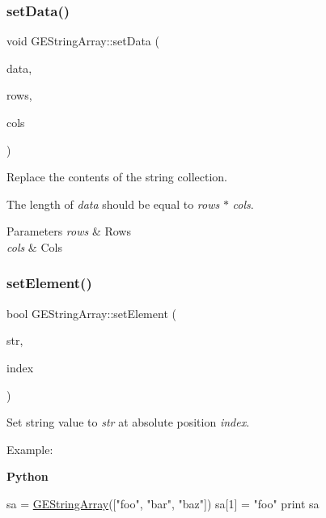 \subsubsection{\texorpdfstring{set\+Data()}{setData()}}
{\footnotesize\ttfamily void G\+E\+String\+Array\+::set\+Data (\begin{DoxyParamCaption}\item[{V\+E\+C\+T\+O\+R\+\_\+\+D\+A\+TA(string)}]{data,  }\item[{int}]{rows,  }\item[{int}]{cols }\end{DoxyParamCaption})}



Replace the contents of the string collection. 

The length of {\itshape data} should be equal to {\itshape rows} $\ast$ {\itshape cols}.


\begin{DoxyParams}{Parameters}
{\em rows} & Rows \\
\hline
{\em cols} & Cols \\
\hline
\end{DoxyParams}
\mbox{\label{class_g_e_string_array_ac8731099a1d1a09a6a3fce0bc9495dfb}} 
\subsubsection{\texorpdfstring{set\+Element()}{setElement()}\hspace{0.1cm}{\footnotesize\ttfamily [1/2]}}
{\footnotesize\ttfamily bool G\+E\+String\+Array\+::set\+Element (\begin{DoxyParamCaption}\item[{const string \&}]{str,  }\item[{int}]{index }\end{DoxyParamCaption})}



Set string value to {\itshape str} at absolute position {\itshape index}. 

Example\+:

{\bfseries Python} 
\begin{DoxyCode}
sa = \hyperlink{class_g_e_string_array}{GEStringArray}([\textcolor{stringliteral}{"foo"}, \textcolor{stringliteral}{"bar"}, \textcolor{stringliteral}{"baz"}])
sa[1] = \textcolor{stringliteral}{"foo"}
\textcolor{keywordflow}{print} sa
\end{DoxyCode}


